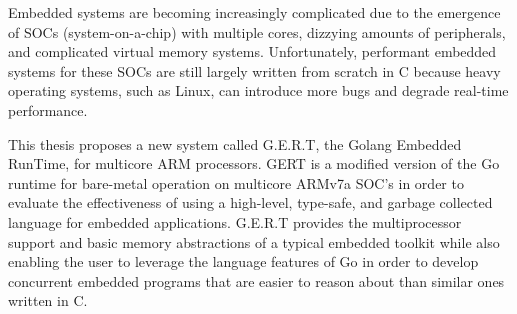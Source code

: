 % 
% 
%

Embedded systems are becoming increasingly complicated due to the emergence of
SOCs (system-on-a-chip) with multiple cores, dizzying amounts of peripherals, and
complicated virtual memory systems. Unfortunately, performant embedded systems
for these SOCs are still largely written from scratch in C because heavy
operating systems, such as Linux, can introduce more bugs and degrade real-time
performance.

This thesis proposes a new system called G.E.R.T, the Golang Embedded RunTime,
for multicore ARM processors.
GERT is a modified version of the Go runtime for
bare-metal operation on multicore ARMv7a SOC's in order to evaluate
the effectiveness of using a high-level, type-safe, and garbage collected
language for embedded applications. G.E.R.T
provides the multiprocessor support and basic memory abstractions of a
typical embedded toolkit while also enabling the user to leverage the language features
of Go in order to develop
concurrent embedded programs that are easier to reason about than similar ones
written in C.

